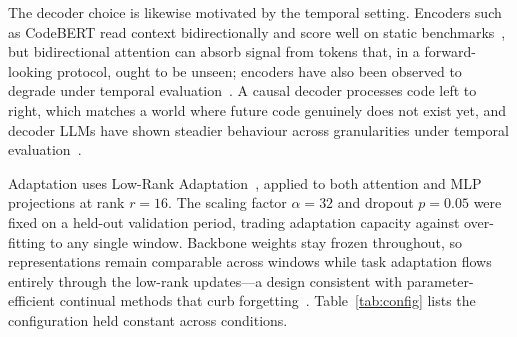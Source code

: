 \documentclass[a4paper,twoside]{article}
\begin{document}
The decoder choice is likewise motivated by the temporal setting. Encoders such as CodeBERT read context bidirectionally and score well on static benchmarks~\citep{Feng2020CodeBERT}, but bidirectional attention can absorb signal from tokens that, in a forward-looking protocol, ought to be unseen; encoders have also been observed to degrade under temporal evaluation~\citep{Lu2021CodeXGLUE}. A causal decoder processes code left to right, which matches a world where future code genuinely does not exist yet, and decoder LLMs have shown steadier behaviour across granularities under temporal evaluation~\citep{Konno2025Taltech}.

Adaptation uses Low-Rank Adaptation~\citep{Hu2021LoRA}, applied to both attention and MLP projections at rank $r=16$. The scaling factor $\alpha=32$ and dropout $p=0.05$ were fixed on a held-out validation period, trading adaptation capacity against over-fitting to any single window. Backbone weights stay frozen throughout, so representations remain comparable across windows while task adaptation flows entirely through the low-rank updates---a design consistent with parameter-efficient continual methods that curb forgetting~\citep{Qiao2024BotherLess}. Table~\ref{tab:config} lists the configuration held constant across conditions.

\begin{table}[t]
  \centering
  \caption{Training configuration held constant across all experimental conditions. Reproduced from the conference version~\citep{Dou2026ICISSP}.}
  \label{tab:config}
\end{table}
\end{document}
